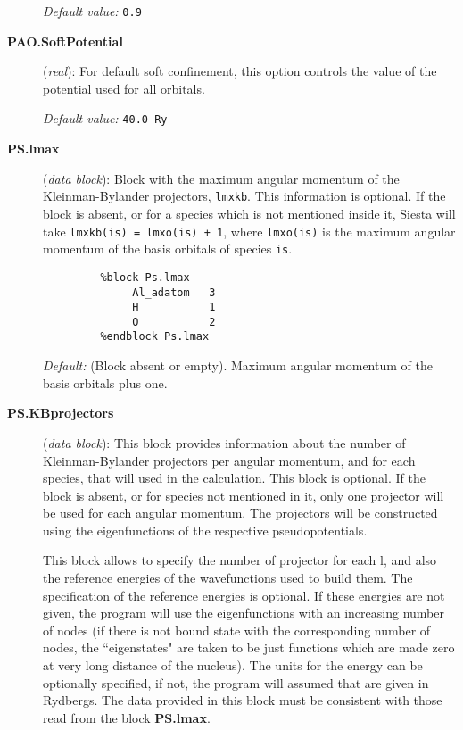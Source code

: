 \documentclass[11pt]{article}
\begin{document}
\begin{description}
{\it Default value:} {\tt 0.9}

\item[{\bf PAO.SoftPotential}] ({\it real}):
For default soft confinement, this option controls the value of the
potential used
for all orbitals.

{\it Default value:} {\tt 40.0 Ry}


\item[{\bf PS.lmax}]  ({\it data block}): 
Block with the maximum angular momentum of the Kleinman-Bylander 
projectors, {\tt lmxkb}. 
This information is optional. If the block 
is absent, or for a species which is not mentioned inside 
it, {\sc Siesta} will take {\tt lmxkb(is) = lmxo(is) + 1}, where {\tt lmxo(is)}
is the maximum angular momentum of the basis orbitals of species {\tt is}.
\begin{verbatim}
         %block Ps.lmax
              Al_adatom   3
              H           1
              O           2
         %endblock Ps.lmax
\end{verbatim}
{\it Default:} (Block absent or empty). Maximum angular momentum 
of the basis orbitals plus one.
\noindent

\item[{\bf PS.KBprojectors}] ({\it data block}):
This block provides information about the number of Kleinman-Bylander
projectors per angular momentum, and for each species, that will used
in the calculation. This block is optional.
If the block is absent, or for species not mentioned in it, only 
one projector will be used for each angular momentum. The projectors
will be constructed using the eigenfunctions of the respective
pseudopotentials. 


This block allows to specify the number of projector for each l, and also
the reference energies of the wavefunctions used to build them.
The specification of the reference energies is optional. If these 
energies are not given, the program will use the eigenfunctions with an
increasing number of nodes (if there is not bound state with
the corresponding number of nodes, the ``eigenstates" are taken to be just
functions which are made zero at very long distance of the nucleus).
The units for the energy can be optionally specified, if not, the 
program will assumed that are given in Rydbergs. 
The data provided in this block must be consistent with those 
read from the block {\bf PS.lmax}. 


\end{description}
\end{document}
